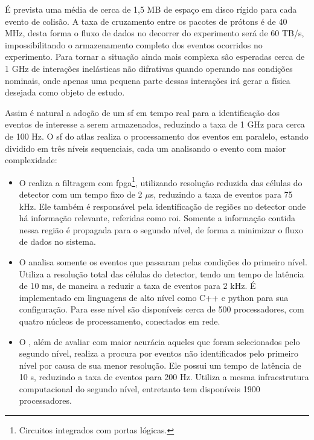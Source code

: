 É prevista uma média de cerca de 1,5 MB de espaço em disco rígido para cada evento de 
colisão. A taxa de cruzamento entre os pacotes de prótons é de 40 MHz, 
desta forma o fluxo de dados no decorrer do experimento será de 60 TB/s, impossibilitando o
armazenamento completo dos eventos ocorridos no experimento. Para tornar a
situação ainda mais complexa são esperadas cerca de 1 GHz de interações
inelásticas não difrativas quando operando nas condições nominais, onde apenas
uma pequena parte dessas interações irá gerar a física desejada como objeto de
estudo.

Assim é natural a adoção de um \glsdesc{sf} em tempo real para a
identificação dos eventos de interesse a serem armazenados, reduzindo a taxa de 1 GHz
para cerca de 100 Hz. O \glsdesc{sf} do \gls{atlas} realiza o processamento dos 
eventos em paralelo, estando dividido em três níveis sequenciais, cada um 
analisando o evento com maior complexidade:

\begin{itemize}
\item O  realiza a filtragem com
\gls{fpga}\footnote{Circuitos integrados com portas lógicas.}, 
utilizando resolução reduzida das células do detector
com um tempo fixo de 2 $\mu$s, reduzindo a taxa de eventos para
75 kHz. Ele também é responsável pela identificação de regiões no detector onde
há informação relevante, referidas como \gls{roi}. Somente a
informação contida nessa região é propagada para o segundo nível, de forma a
minimizar o fluxo de dados no sistema.
\item O  analisa somente os eventos que passaram pelas condições do
primeiro nível. Utiliza a resolução total das células do detector, 
tendo um tempo de latência de 10 ms, de maneira a reduzir a taxa de eventos para
2 kHz. É implementado em linguagens de alto nível como C++ e python para sua configuração. 
Para esse nível são disponíveis cerca de 500 processadores, com quatro
núcleos de processamento, conectados em rede.
\item O , além de avaliar com maior acurácia aqueles que foram
selecionados pelo segundo nível, realiza a procura por eventos não identificados pelo
primeiro nível por causa de sua menor resolução. Ele possui um tempo de 
latência de 10 s, reduzindo a taxa de eventos para 200 Hz. Utiliza a mesma
infraestrutura computacional do segundo nível, entretanto tem disponíveis 1900
processadores.
\end{itemize}


